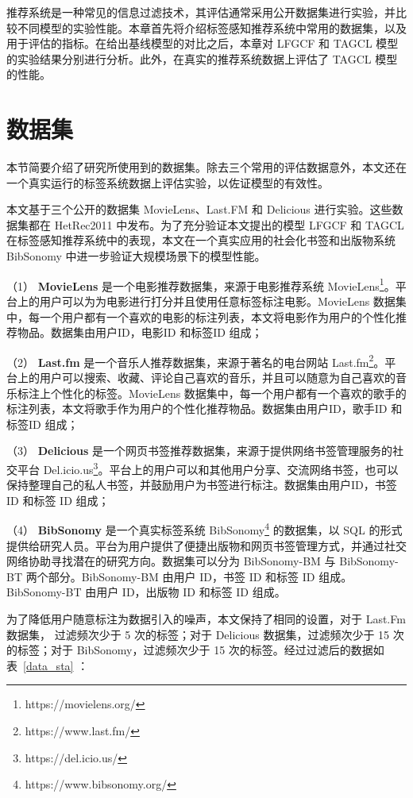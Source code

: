 推荐系统是一种常见的信息过滤技术，其评估通常采用公开数据集进行实验，并比较不同模型的实验性能。本章首先将介绍标签感知推荐系统中常用的数据集，以及用于评估的指标。在给出基线模型的对比之后，本章对 LFGCF 和 TAGCL 模型的实验结果分别进行分析。此外，在真实的推荐系统数据上评估了 TAGCL 模型的性能。

\section{数据集}
本节简要介绍了研究所使用到的数据集。除去三个常用的评估数据意外，本文还在一个真实运行的标签系统数据上评估实验，以佐证模型的有效性。

本文基于三个公开的数据集 MovieLens、Last.FM 和 Delicious 进行实验。这些数据集都在 HetRec2011\cite{cantador_hetrec_2011} 中发布。为了充分验证本文提出的模型 LFGCF 和 TAGCL 在标签感知推荐系统中的表现，本文在一个真实应用的社会化书签和出版物系统 BibSonomy 中进一步验证大规模场景下的模型性能。

（1） \textbf{MovieLens} 是一个电影推荐数据集，来源于电影推荐系统 MovieLens\footnote{https://movielens.org/}。平台上的用户可以为为电影进行打分并且使用任意标签标注电影。MovieLens 数据集中，每一个用户都有一个喜欢的电影的标注列表，本文将电影作为用户的个性化推荐物品。数据集由用户ID，电影ID 和标签ID 组成；

（2） \textbf{Last.fm} 是一个音乐人推荐数据集，来源于著名的电台网站 Last.fm\footnote{https://www.last.fm/}。平台上的用户可以搜索、收藏、评论自己喜欢的音乐，并且可以随意为自己喜欢的音乐标注上个性化的标签。MovieLens 数据集中，每一个用户都有一个喜欢的歌手的标注列表，本文将歌手作为用户的个性化推荐物品。数据集由用户ID，歌手ID 和标签ID 组成；

（3） \textbf{Delicious} 是一个网页书签推荐数据集，来源于提供网络书签管理服务的社交平台 Del.icio.us\footnote{https://del.icio.us/}。平台上的用户可以和其他用户分享、交流网络书签，也可以保持整理自己的私人书签，并鼓励用户为书签进行标注。数据集由用户ID，书签 ID 和标签 ID 组成；

（4） \textbf{BibSonomy} 是一个真实标签系统 BibSonomy\footnote{https://www.bibsonomy.org/} 的数据集，以 SQL 的形式提供给研究人员。平台为用户提供了便捷出版物和网页书签管理方式，并通过社交网络协助寻找潜在的研究方向。数据集可以分为 BibSonomy-BM 与 BibSonomy-BT 两个部分。BibSonomy-BM 由用户 ID，书签 ID 和标签 ID 组成。BibSonomy-BT 由用户 ID，出版物 ID 和标签 ID 组成。

为了降低用户随意标注为数据引入的噪声，本文保持了\cite{zuo_tag-aware_2016}相同的设置，对于 Last.Fm 数据集， 过滤频次少于 5 次的标签；对于 Delicious 数据集，过滤频次少于 15 次的标签；对于 BibSonomy，过滤频次少于 15 次的标签。经过过滤后的数据如表~\ref{data_sta} ：

